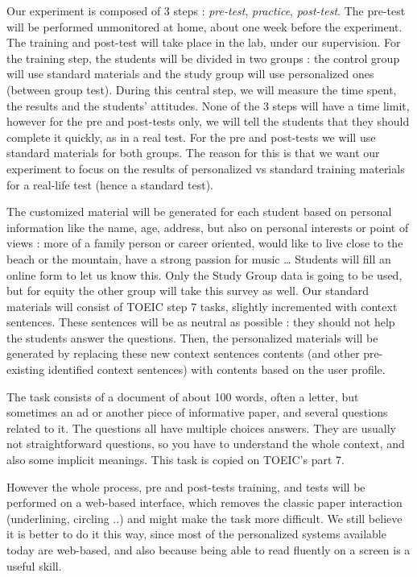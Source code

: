\documentclass[a4paper,12pt]{article}
\begin{document}
Our experiment is composed of 3 steps : \textit{pre-test}, \textit{practice}, \textit{post-test}. The pre-test will be performed unmonitored at home, about one week before the experiment. The training and post-test will take place in the lab, under our supervision. For the training step, the students will be divided in two groups : the control group will use standard materials and the study group will use personalized ones (between group test). During this central step, we will measure the time spent, the results and the students' attitudes. None of the 3 steps will have a time limit, however for the pre and post-tests only, we will tell the students that they should complete it quickly, as in a real test. For the pre and post-tests we will use standard materials for both groups. The reason for this is that we want our experiment to focus on the results of personalized vs standard training materials for a real-life test (hence a standard test).

The customized material will be generated for each student based on personal information like the name, age, address, but also on personal interests or point of views : more of a family person or career oriented, would like to live close to the beach or the mountain, have a strong passion for music … Students will fill an online form to let us know this. Only the Study Group data is going to be used, but for equity the other group will take this survey as well. Our standard materials will consist of TOEIC step 7 tasks, slightly incremented with context sentences. These sentences will be as neutral as possible : they should not help the students answer the questions. Then, the personalized materials will be generated by replacing these new context sentences contents (and other pre-existing identified context sentences) with contents based on the user profile.

The task consists of a document of about 100 words, often a letter, but sometimes an ad or another piece of informative paper, and several questions related to it. The questions all have multiple choices answers. They are usually not straightforward questions, so you have to understand the whole context, and also some implicit meanings. This task is copied on TOEIC's part 7.

However the whole process, pre and post-tests training, and tests will be performed on a web-based interface, which removes the classic paper interaction (underlining, circling ..) and might make the task more difficult. We still believe it is better to do it this way, since most of the personalized systems available today are web-based, and also because being able to read fluently on a screen is a useful skill.
\end{document}
